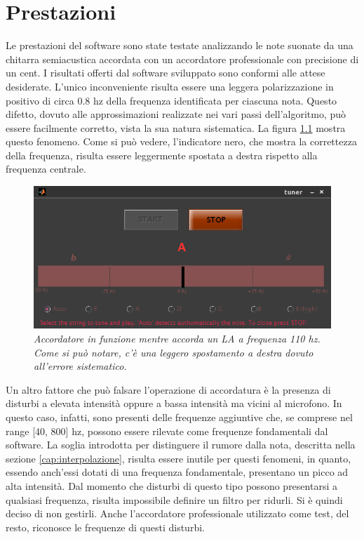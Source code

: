 \chapter{Prestazioni}\label{cap:prestazioni}

Le prestazioni del software sono state testate analizzando le note suonate da una chitarra semiacustica accordata con un accordatore professionale con precisione di un cent.
I risultati offerti dal software sviluppato sono conformi alle attese desiderate.
L'unico inconveniente risulta essere una leggera polarizzazione in positivo di circa 0.8 hz della frequenza identificata per ciascuna nota.
Questo difetto, dovuto alle approssimazioni realizzate nei vari passi dell'algoritmo, può essere facilmente corretto, vista la sua natura sistematica.
La figura \ref{fig:accordatore_in_funzione} mostra questo fenomeno.
Come si può vedere, l'indicatore nero, che mostra la correttezza della frequenza, risulta essere leggermente spostata a destra rispetto alla frequenza centrale. 

\begin{figure}[h]
  \begin{center} 
    \includegraphics[width=\textwidth*\real{0.8}]{images/ch_08/prestazioni.png}
  \end{center} 
  \caption{\textit{Accordatore in funzione mentre accorda un LA a frequenza 110 hz. Come si può notare, c'è una leggero spostamento a destra dovuto all'errore sistematico.}}  
  \label{fig:accordatore_in_funzione}
\end{figure}

Un altro fattore che può falsare l'operazione di accordatura è la presenza di disturbi a elevata intensità oppure a bassa intensità ma vicini al microfono. 
In questo caso, infatti, sono presenti delle frequenze aggiuntive che, se comprese nel range [40, 800] hz, possono essere rilevate come frequenze fondamentali dal software.
La soglia introdotta per distinguere il rumore dalla nota, descritta nella sezione \ref{cap:interpolazione}, risulta essere inutile per questi fenomeni, in quanto, essendo anch'essi dotati di una frequenza fondamentale, presentano un picco ad alta intensità. 
Dal momento che disturbi di questo tipo possono presentarsi a qualsiasi frequenza, risulta impossibile definire un filtro per ridurli. 
Si è quindi deciso di non gestirli.
Anche l'accordatore professionale utilizzato come test, del resto, riconosce le frequenze di questi disturbi.
 
